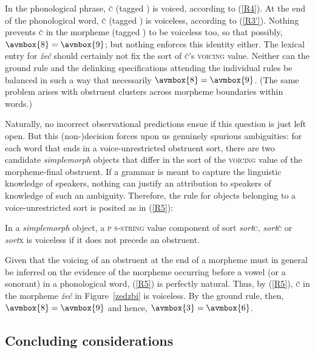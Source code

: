 \documentclass[output=paper]{langsci/langscibook}
\begin{document}
In the phonological phrase, \textsc{\v{c}} (tagged ) is voiced,
according to (\ref{R4}).  At the end of the phonological word, \textsc{\v{c}}
(tagged ) is voiceless, according to (\ref{R3'}). Nothing prevents
\textsc{\v{c}} in the morpheme (tagged ) to be voiceless too, so that
possibly, $\avmbox{8} = \avmbox{9}$; but nothing enforces this identity either. The
lexical entry for \emph{\v{z}e\v{c}} should certainly not fix the sort of \textsc{\v{c}}'s \textsc{voicing} value. Neither can the ground rule and the
delinking specifications attending the individual rules be balanced in such
a way that necessarily $\avmbox{8} = \avmbox{9}$. (The same problem arises with
obstruent clusters across morpheme boundaries within words.)

Naturally, no incorrect observational predictions ensue if this question is
just left open. But this (non-)decision forces upon us genuinely spurious
ambiguities: for each word that ends in a voice-unrestricted obstruent
sort, there are two candidate \textit{simplemorph} objects that differ in the
sort of the \textsc{voicing} value of the morpheme-final obstruent. If a
grammar is meant to capture 
the
linguistic knowledge of speakers, nothing can
justify an attribution to speakers of knowledge of such an ambiguity.
Therefore, the rule for objects belonging to a voice-unrestricted sort is
posited as in (\ref{R5}):
%
\begin{exe}
\ex
\label{R5} In a \textit{simplemorph} object, a \textsc{p s-string}
  value component of sort \textit{sort}{\textunderscore}\textsc{c}, \textit{sort}{\textunderscore}\textsc{\v{c}} or
  \textit{sort}{\textunderscore}\textsc{x} is voiceless if it does not precede an obstruent.
\end{exe}


Given that the voicing of an obstruent at the end of a morpheme must in
general be inferred on the evidence of the morpheme occurring before a
vowel (or a sonorant) in a phonological word, (\ref{R5}) is perfectly
natural. Thus, by (\ref{R5}), \textsc{\v{c}} in the morpheme
\emph{\v{z}e\v{c}} in Figure~\ref{zedzbi} is voiceless. By the ground rule,
then, $\avmbox{8} = \avmbox{9}$ and hence, $\avmbox{3} = \avmbox{6}$.  %



\subsection{Concluding considerations}
\label{sec:1.7.4}
\end{document}
